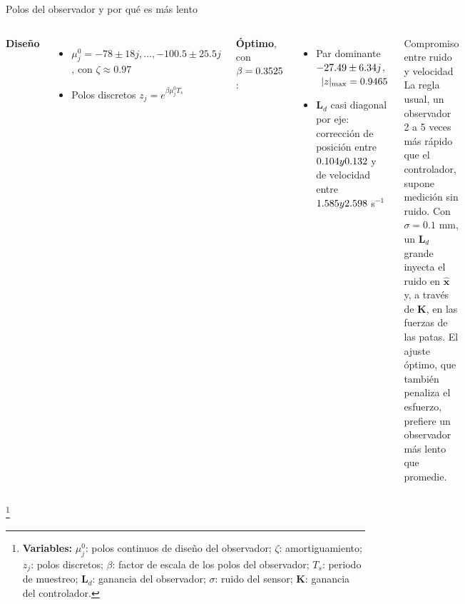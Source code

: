 \documentclass[aspectratio=169,10pt]{beamer}
\newcommand{\vect}[1]{\bm{#1}}
\newcommand{\variables}[1]{\begingroup\renewcommand{\thefootnote}{}\footnote[frame]{\textbf{Variables:} #1}\addtocounter{footnote}{-1}\endgroup}
\begin{document}
\begin{frame}{Polos del observador y por qué es más lento}
\small
\begin{columns}[T]
\textbf{Diseño}
\begin{itemize}
\setlength{\itemsep}{0.3em}
\item $\mu_j^0 = -78\pm18j, \dots, -100.5\pm25.5j$, con $\zeta\approx0.97$
\item Polos discretos $z_j = e^{\beta\mu_j^0T_s}$
\end{itemize}
\textbf{Óptimo}, con $\beta = 0.3525$:
\begin{itemize}
\setlength{\itemsep}{0.3em}
\item Par dominante $-27.49 \pm 6.34j$, \ $|z|_{\max} = 0.9465$
\item $\vect L_d$ casi diagonal por eje: corrección de posición entre $0.104 y 0.132$ y de velocidad entre $1.585 y 2.598$ s$^{-1}$
\end{itemize}
\begin{block}{Compromiso entre ruido y velocidad}
La regla usual, un observador 2 a 5 veces más rápido que el controlador, supone medición sin ruido. Con $\sigma = 0.1$ mm, un $\vect L_d$ grande inyecta el ruido en $\hat{\vect x}$ y, a través de $\vect K$, en las fuerzas de las patas. El ajuste óptimo, que también penaliza el esfuerzo, prefiere un observador más lento que promedie.
\end{block}
\end{columns}
\variables{$\mu_j^0$: polos continuos de diseño del observador; $\zeta$: amortiguamiento; $z_j$: polos discretos; $\beta$: factor de escala de los polos del observador; $T_s$: periodo de muestreo; $\vect L_d$: ganancia del observador; $\sigma$: ruido del sensor; $\vect K$: ganancia del controlador.}
\end{frame}
\end{document}
